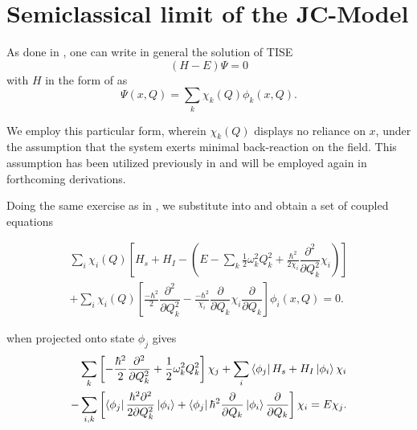 \section{Semiclassical limit of the JC-Model\label{sec:class_jcm_sec1}}
As done in , one can write in general the solution of 
TISE 
\begin{equation}
    \label{eq:class_jcm_eq2}
    (H - E)\Psi = 0
\end{equation}
with $H$ in the form of  as 
\begin{equation}
    \label{eq:class_jcm_eq3}
    \Psi(x, Q) = \sum_{k} \chi_k(Q) \phi_k(x, Q).
\end{equation}

We employ this particular form, wherein $\chi_k(Q)$ displays no reliance on $x$, 
under the assumption that the system exerts minimal back-reaction on the field.
This assumption has been utilized previously in  
and will be employed again in forthcoming derivations.

Doing the same exercise as in , we substitute
 into  and obtain a set of coupled equations

\begin{align}
    \label{eq:class_jcm_eq4}
   \sum_i \chi_i(Q) \left[H_s + H_I - \left(E - \sum_k
    \frac{1}{2}\omega_k^2 Q_k^2 + \frac{\hbar^2}{2\chi_i}\dfrac{\partial^2}{\partial Q_k^2}
    \chi_i\right) \right]\nonumber \\
    + \sum_i \chi_i(Q) \left[
        \frac{-\hbar^2}{2}\dfrac{\partial^2}{\partial Q_k^2} - 
        \frac{-\hbar^2}{\chi_i}\dfrac{\partial}{\partial Q_k}\chi_i\dfrac{\partial}{\partial Q_k}
    \right]\phi_i (x, Q) = 0.
\end{align}

 when projected onto state \(\phi_j\) gives
\begin{align}
    \label{eq:class_jcm_eq5}
    \sum_k \left[-\frac{\hbar^2}{2}\dfrac{\partial^2}{\partial Q_k^2}
     + \frac{1}{2} \omega_k^2 Q_k^2 \right]\chi_j
    + \sum_i \bra{\phi_j}H_s + H_I\ket{\phi_i}\chi_i \nonumber \\
   - \sum_{i, k} \left[
    \bra{\phi_j}\frac{\hbar^2 \partial^2}{2 \partial Q_k^2}\ket{\phi_i}
    + \bra{\phi_j}{\hbar^2}\dfrac{\partial}{\partial Q_k}\ket{\phi_i}\dfrac{\partial}{\partial Q_k}
   \right]\chi_i = E \chi_j.
\end{align}

